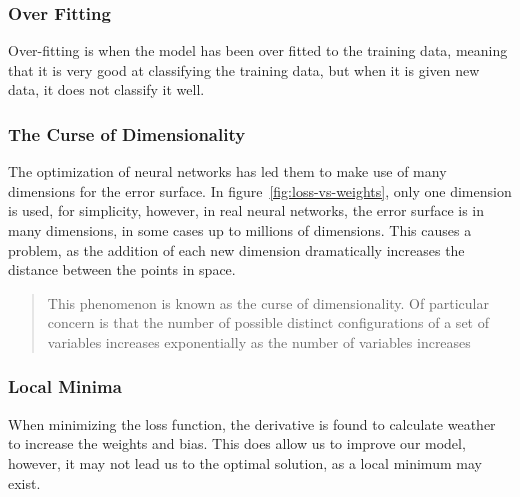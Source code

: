 \documentclass[titlepage]{article}
\begin{document}
\subsubsection{Over Fitting}
Over-fitting is when the model has been over fitted to the training data, meaning that it is very good at classifying the training data, but when it is given new data, it does not classify it well.

\subsubsection{The Curse of Dimensionality}
The optimization of neural networks has led them to make use of many dimensions for the error surface. In figure~\ref{fig:loss-vs-weights}, only one dimension is used, for simplicity, however, in real neural networks, the error surface is in many dimensions, in some cases up to millions of dimensions. This causes a problem, as the addition of each new dimension dramatically increases the distance between the points in space.\cite{curse-of-dimensionality}
\begin{quotation}
    This phenomenon is known as the curse of dimensionality. Of particular concern is that the number of possible distinct configurations of a set of variables increases exponentially as the number of variables increases
\end{quotation}

\subsubsection{Local Minima}
When minimizing the loss function, the derivative is found to calculate weather to increase the weights and bias. This does allow us to improve our model, however, it may not lead us to the optimal solution, as a local minimum may exist.
\end{document}
